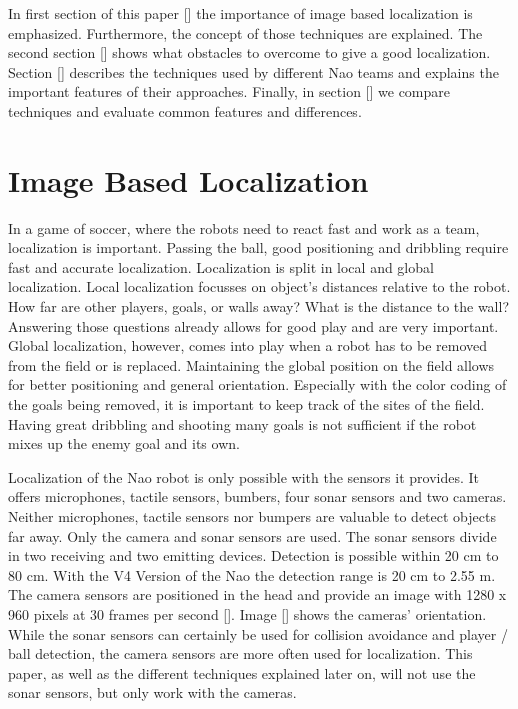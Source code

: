 \documentclass[12pt, a4paper]{scrartcl}
\begin{document}
  In first section of this paper [] the importance of image based localization is emphasized. Furthermore, the concept of those techniques are explained. The second section [] shows what obstacles to overcome to give a good localization. Section [] describes the techniques used by different Nao teams and explains the important features of their approaches. Finally, in section [] we compare techniques and evaluate common features and differences.

  \section{Image Based Localization}
  In a game of soccer, where the robots need to react fast and work as a team, localization is important. Passing the ball, good positioning and dribbling require fast and accurate localization. Localization is split in local and global localization. Local localization focusses on object's distances relative to the robot. How far are other players, goals, or walls away? What is the distance to the wall? Answering those questions already allows for good play and are very important. Global localization, however, comes into play when a robot has to be removed from the field or is replaced. Maintaining the global position on the field allows for better positioning and general orientation. Especially with the color coding of the goals being removed, it is important to keep track of the sites of the field. Having great dribbling and shooting many goals is not sufficient if the robot mixes up the enemy goal and its own.

  Localization of the Nao robot is only possible with the sensors it provides. It offers microphones, tactile sensors, bumbers, four sonar sensors and two cameras. Neither microphones, tactile sensors nor bumpers are valuable to detect objects far away. Only the camera and sonar sensors are used. The sonar sensors divide in two receiving and two emitting devices. Detection is possible within 20 cm to 80 cm. With the V4 Version of the Nao the detection range is 20 cm to 2.55 m. The camera sensors are positioned in the head and provide an image with 1280 x 960 pixels at 30 frames per second []. Image [] shows the cameras' orientation. While the sonar sensors can certainly be used for collision avoidance and player / ball detection, the camera sensors are more often used for localization. This paper, as well as the different techniques explained later on, will not use the sonar sensors, but only work with the cameras.
\end{document}
